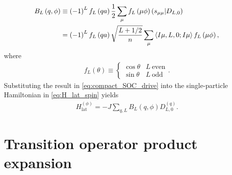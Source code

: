 \documentclass[nofootinbib,notitlepage,11pt]{revtex4-2}
\renewcommand{\t}{\text} %
\newcommand{\f}[2]{\dfrac{#1}{#2}} %
\newcommand{\p}[1]{\left(#1\right)} %
\newcommand{\bk}{\Braket} %
\newcommand{\1}{\mathds{1}}
\def\obk#1{\mathinner{({#1})}}
\begin{document}
\begin{align}
  B_L\p{q,\phi}
  &\equiv \p{-1}^L f_L\p{qa} \f12
  \sum_\mu f_L\p{\mu\phi} \obk{s_{\mu\mu}|D_{L,0}} \\
  &= \p{-1}^L f_L\p{qa} \sqrt{\f{L+1/2}{n}}
  \sum_\mu \bk{I\mu,L,0;I\mu} f_L\p{\mu\phi},
\end{align}
where
\begin{align}
  f_L\p{\theta} \equiv
  \begin{cases}
    \cos\theta & L~\t{even} \\
    \sin\theta & L~\t{odd}
  \end{cases}.
\end{align}
Substituting the result in \eqref{eq:compact_SOC_drive} into the
single-particle Hamiltonian in \eqref{eq:H_lat_spin} yields
\begin{align}
  H_{\t{lat}}^{(\phi)} = -J \sum_{q,L} B_L\p{q,\phi} D_{L,0}^{(q)}.
\end{align}

\section{Transition operator product expansion}
\label{sec:trans_prod}
\end{document}
